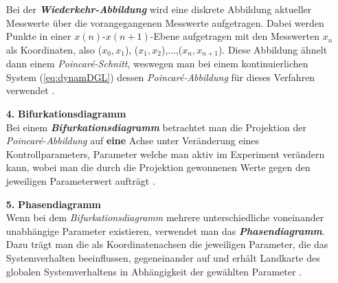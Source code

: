 \begin{itemize}
    Bei der \textit{\textbf{Wiederkehr-Abbildung}} wird eine diskrete Abbildung aktueller Messwerte über die vorangegangenen Messwerte aufgetragen. Dabei werden Punkte in einer $x(n)$-$x(n+1)$-Ebene aufgetragen mit den Messwerten $x_n$ als Koordinaten, also ($x_0,x_1$), ($x_1,x_2$),...,($x_n,x_{n+1}$). Diese Abbildung ähnelt dann einem \textit{Poincar\'e-Schnitt}, weswegen man bei einem kontinuierlichen System (\ref{eq:dynamDGL}) dessen \textit{Poincar\'e-Abbildung} für dieses Verfahren verwendet \citep{Lueck}.
    \item[\textbf{4.}]{\textbf{Bifurkationsdiagramm}}\\
    Bei einem \textit{\textbf{Bifurkationsdiagramm}} betrachtet man die Projektion der \textit{Poincar\'e-Abbildung} auf \textbf{eine} Achse unter Veränderung eines Kontrollparameters, Parameter welche man aktiv im Experiment verändern kann, wobei man die durch die Projektion gewonnenen Werte gegen den jeweiligen Parameterwert aufträgt \citep{Lueck}.
    \item[\textbf{5.}]{\textbf{Phasendiagramm}}\\
    Wenn bei dem \textit{Bifurkationsdiagramm} mehrere unterschiedliche voneinander unabhängige Parameter existieren, verwendet man das \textit{\textbf{Phasendiagramm}}. Dazu trägt man die als Koordinatenachsen die jeweiligen Parameter, die das Systemverhalten beeinflussen, gegeneinander auf und erhält Landkarte des globalen Systemverhaltens in Abhängigkeit der gewählten Parameter \citep{Lueck}.  
\end{itemize}